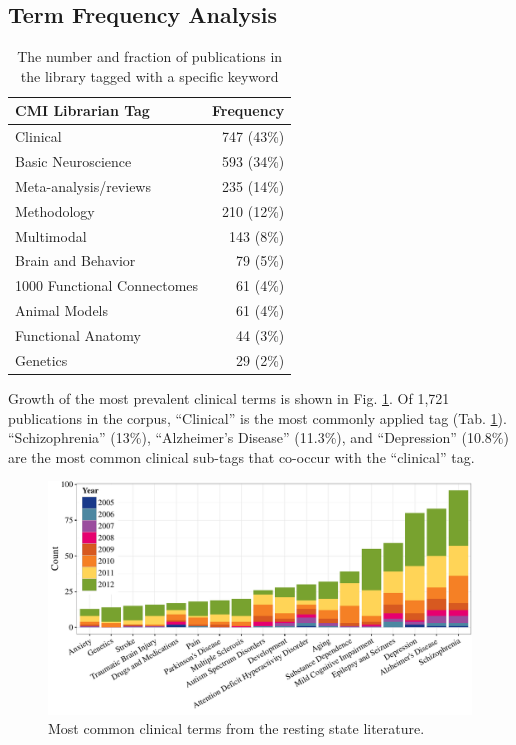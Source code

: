 \documentclass[12pt,5p]{elsarticle}
\begin{document}
\subsection{Term Frequency Analysis}

\begin{table}[H]
\caption{\label{tagfreqtable} The number and fraction of publications in the
library tagged with a specific keyword}
\begin{center}
\begin{tabular}{|l|r|}
\hline
{\bf CMI Librarian Tag}&{\bf Frequency} \\ \hline \hline
Clinical & 747 (43\%) \\ \hline
Basic Neuroscience&593 (34\%) \\ \hline
Meta-analysis/reviews&235 (14\%) \\ \hline
Methodology&210 (12\%) \\ \hline
Multimodal&143 (8\%) \\ \hline
Brain and Behavior&79 (5\%) \\ \hline
1000 Functional Connectomes&61 (4\%) \\ \hline
Animal Models&61 (4\%) \\ \hline
Functional Anatomy&44 (3\%) \\ \hline
Genetics&29 (2\%) \\ \hline
\end{tabular}
\end{center}
\end{table}


Growth of the most prevalent clinical terms is shown in Fig.
\ref{fig:clinical_bytag_hist}. Of 1,721 publications in the corpus,
``Clinical'' is the most commonly applied tag (Tab. \ref{tagfreqtable}).
``Schizophrenia'' (13\%), ``Alzheimer's Disease'' (11.3\%), and
``Depression'' (10.8\%) are the most common clinical sub-tags that
co-occur with the ``clinical'' tag.

\begin{figure}
  \begin{center}
    \includegraphics[]{figures/clinical_bytag_hist}%
    \caption{Most common clinical terms from the resting state literature.
        \label{fig:clinical_bytag_hist}
    }
  \end{center}
\end{figure}
\end{document}
